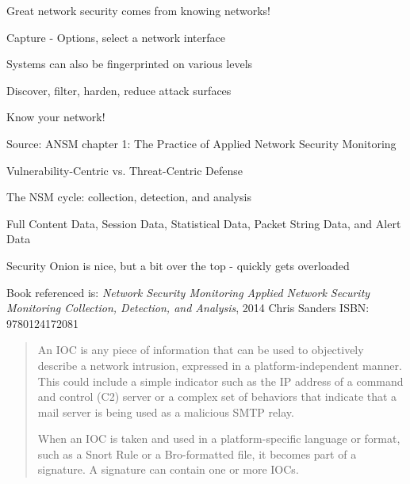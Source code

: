 \documentclass[Screen16to9,17pt]{foils}
\begin{document}
\vskip 5mm

\centerline{\Large Great network security comes from knowing networks!}





\centerline{Capture - Options, select a network interface}
\centerline{}





\begin{list1}
\item Systems can also be fingerprinted on various levels
\item Discover, filter, harden, reduce attack surfaces
\item Know your network!
\end{list1}




Source: ANSM chapter 1: The Practice of Applied Network Security Monitoring
\begin{list2}
\item Vulnerability-Centric vs. Threat-Centric Defense
\item The NSM cycle: collection, detection, and analysis
\item Full Content Data, Session Data, Statistical Data, Packet String Data, and Alert Data
\item Security Onion is nice, but a bit over the top - quickly gets overloaded

\item Book referenced is: \emph{Network Security Monitoring
Applied Network Security Monitoring Collection, Detection, and Analysis}, 2014 Chris Sanders ISBN: 9780124172081
\end{list2}




\begin{quote}
An IOC is any piece of information that can be used to objectively describe a
network intrusion, expressed in a platform-independent manner. This could include a simple indicator such as the IP address of a command and control (C2) server or a complex set of behaviors that indicate that a mail server is being used as a malicious SMTP relay.

When an IOC is taken and used in a platform-specific language or format, such as a Snort Rule or a Bro-formatted file, it becomes part of a signature. A signature can contain one or more IOCs.
\end{quote}
\end{document}
